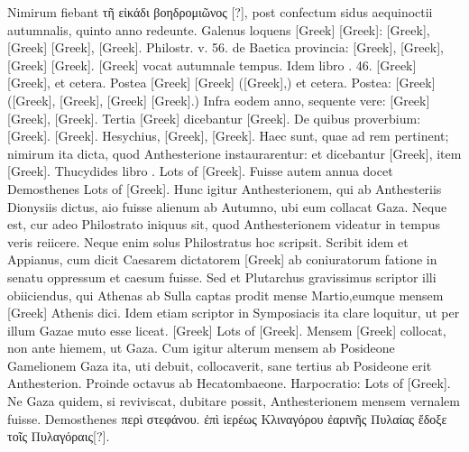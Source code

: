 Nimirum fiebant \textgreek{τῆ εἰκάδι βοηδρομιῶνος [?]},
 post confectum sidus aequinoctii
autumnalis, quinto anno redeunte.
Galenus loquens \textgreek{[Greek]}
\textgreek{[Greek]}: \textgreek{[Greek]},
 \textgreek{[Greek]}
\textgreek{[Greek]}, \textgreek{[Greek]}.
Philostr. v. 56. de
Baetica provincia: \textgreek{[Greek]}, \textgreek{[Greek]},
 \textgreek{[Greek]}
\textgreek{[Greek]}.
\textgreek{[Greek]} vocat autumnale tempus.
Idem libro . 46. \textgreek{[Greek]}
\textgreek{[Greek]}, et cetera.
Postea \textgreek{[Greek]}
\textgreek{[Greek]} (\textgreek{[Greek]},) et cetera.
Postea:
\textgreek{[Greek]} (\textgreek{[Greek]}, \textgreek{[Greek]},
 \textgreek{[Greek]}
\textgreek{[Greek]}.)
Infra eodem anno, sequente vere: \textgreek{[Greek]}
\textgreek{[Greek]}, \textgreek{[Greek]}.
Tertia
\textgreek{[Greek]} dicebantur \textgreek{[Greek]}.
De quibus proverbium: \textgreek{[Greek]}.
\textgreek{[Greek]}.
Hesychius, \textgreek{[Greek]}, \textgreek{[Greek]}.
Haec sunt, quae ad rem
pertinent; nimirum ita dicta, quod Anthesterione instaurarentur: et
dicebantur \textgreek{[Greek]}, item \textgreek{[Greek]}.
Thucydides
libro .
\textgreek{Lots of [Greek]}.
Fuisse autem annua docet Demosthenes
\textgreek{Lots of [Greek]}.
Hunc igitur Anthesterionem, qui ab
Anthesteriis Dionysiis dictus, aio fuisse alienum ab Autumno, ubi
eum collacat Gaza.
Neque est, cur adeo Philostrato iniquus sit, quod
Anthesterionem videatur in tempus veris reiicere.
Neque enim solus
Philostratus hoc scripsit.
Scribit idem et Appianus, cum dicit Caesarem
dictatorem \textgreek{[Greek]} ab coniuratorum fatione in senatu
oppressum et caesum fuisse.
Sed et Plutarchus gravissimus scriptor illi
obiiciendus, qui Athenas ab Sulla captas prodit mense Martio,eumque
mensem \textgreek{[Greek]} Athenis dici.
Idem etiam scriptor in Symposiacis
ita clare loquitur, ut per illum Gazae muto esse liceat.
 \textgreek{[Greek]}
\textgreek{Lots of [Greek]}.
Mensem
\textgreek{[Greek]} collocat, non ante hiemem, ut Gaza.
Cum
igitur alterum mensem ab Posideone Gamelionem Gaza ita, uti debuit,
collocaverit, sane tertius ab Posideone erit Anthesterion.
Proinde octavus
ab Hecatombaeone.
Harpocratio: \textgreek{Lots of [Greek]}.
Ne Gaza quidem, si reviviscat, dubitare
possit, Anthesterionem mensem vernalem fuisse.
Demosthenes
\textgreek{περὶ στεφάνου.
 ἐπὶ ἱερέως Κλιναγόρου ἐαρινῆς Πυλαίας ἔδοξε τοῖς Πυλαγόραις}[?].

